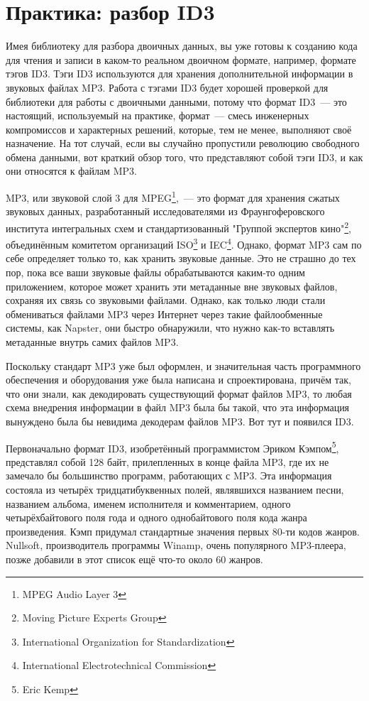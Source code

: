 \chapter{Практика: разбор ID3}
\label{ch:25}

Имея библиотеку для разбора двоичных данных, вы уже готовы к созданию кода для чтения и
записи в каком-то реальном двоичном формате, например, формате тэгов ID3. Тэги ID3
используются для хранения дополнительной информации в звуковых файлах MP3. Работа с тэгами
ID3 будет хорошей проверкой для библиотеки для работы с двоичными данными, потому что
формат ID3~--- это настоящий, используемый на практике, формат~--- смесь инженерных
компромиссов и характерных решений, которые, тем не менее, выполняют своё назначение. На
тот случай, если вы случайно пропустили революцию свободного обмена данными, вот краткий
обзор того, что представляют собой тэги ID3, и как они относятся к файлам MP3.

MP3, или звуковой слой 3 для MPEG\footnote{MPEG Audio Layer 3},~--- это формат для хранения
сжатых звуковых данных, разработанный исследователями из Фраунгоферовского института
интегральных схем и стандартизованный "Группой экспертов кино"\footnote{Moving Picture
  Experts Group}, объединённым комитетом организаций ISO\footnote{International
  Organization for Standardization} и IEC\footnote{International Electrotechnical
  Commission}. Однако, формат MP3 сам по себе определяет только то, как хранить звуковые
данные. Это не страшно до тех пор, пока все ваши звуковые файлы обрабатываются каким-то
одним приложением, которое может хранить эти метаданные вне звуковых файлов, сохраняя их
связь со звуковыми файлами. Однако, как только люди стали обмениваться файлами MP3 через
Интернет через такие файлообменные системы, как Napster, они быстро обнаружили, что нужно
как-то вставлять метаданные внутрь самих файлов MP3.

Поскольку стандарт MP3 уже был оформлен, и значительная часть программного обеспечения и
оборудования уже была написана и спроектирована, причём так, что они знали, как
декодировать существующий формат файлов MP3, то любая схема внедрения информации в файл
MP3 была бы такой, что эта информация вынуждено была бы невидима декодерам файлов MP3. Вот
тут и появился ID3.

Первоначально формат ID3, изобретённый программистом Эриком Кэмпом\footnote{Eric Kemp},
представлял собой 128 байт, прилепленных в конце файла MP3, где их не замечало бы
большинство программ, работающих с MP3. Эта информация состояла из четырёх
тридцатибуквенных полей, являвшихся названием песни, названием альбома, именем исполнителя
и комментарием, одного четырёхбайтового поля года и одного однобайтового поля кода жанра
произведения. Кэмп придумал стандартные значения первых 80-ти кодов жанров. Nullsoft,
производитель программы Winamp, очень популярного MP3-плеера, позже добавили в этот список
ещё что-то около 60 жанров.

